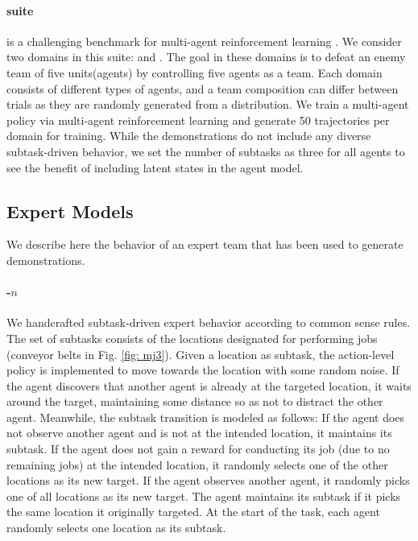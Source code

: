 
\paragraph{\smactwo suite} \smactwo is a challenging benchmark for multi-agent reinforcement learning \cite{ellis2023smacv2}. We consider two domains in this suite: \protoss and \terran. The goal in these domains is to defeat an enemy team of five units(agents) by controlling five agents as a team. Each domain consists of different types of agents, and a team composition can differ between trials as they are randomly generated from a distribution.
We train a multi-agent policy via multi-agent reinforcement learning and generate 50 trajectories per domain for training. While the demonstrations do not include any diverse subtask-driven behavior, we set the number of subtasks as three for all agents to see the benefit of including latent states in the agent model.

\subsection{Expert Models}
We describe here the behavior of an expert team that has been used to generate demonstrations.
\paragraph{\simplemulti-$n$} We handcrafted subtask-driven expert behavior according to common sense rules. The set of subtasks consists of the locations designated for performing jobs (conveyor belts in Fig. \ref{fig: mj3}). Given a location as subtask, the action-level policy is implemented to move towards the location with some random noise. If the agent discovers that another agent is already at the targeted location, it waits around the target, maintaining some distance so as not to distract the other agent. Meanwhile, the subtask transition is modeled as follows: If the agent does not observe another agent and is not at the intended location, it maintains its subtask. If the agent does not gain a reward for conducting its job (due to no remaining jobs) at the intended location, it randomly selects one of the other locations as its new target. If the agent observes another agent, it randomly picks one of all locations as its new target. The agent maintains its subtask if it picks the same location it originally targeted. At the start of the task, each agent randomly selects one location as its subtask.

